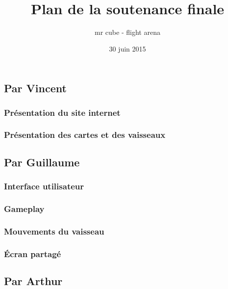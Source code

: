 \documentclass{article}
\title{Plan de la soutenance finale}
\author{mr cube - flight arena}
\date{30 juin 2015}
\begin{document}
\maketitle

\section{}

\section{}

\section{}

\subsection{Par Vincent}
\subsubsection{Présentation du site internet}
\subsubsection{Présentation des cartes et des vaisseaux}

\subsection{Par Guillaume}
\subsubsection{Interface utilisateur}
\subsubsection{Gameplay}
\subsubsection{Mouvements du vaisseau}
\subsubsection{Écran partagé}

\subsection{Par Arthur}
\end{document}
